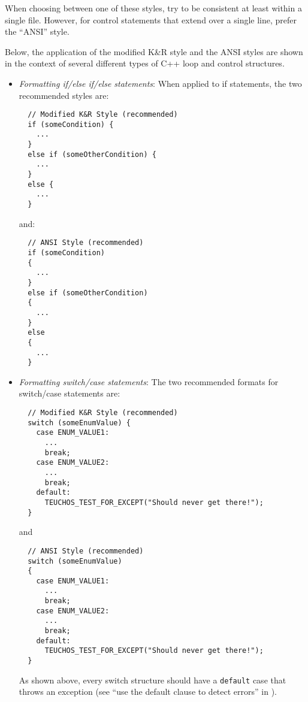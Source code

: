 \begin{itemize}
When choosing between one of these styles, try to be consistent at least
within a single file.  However, for control statements that extend over a
single line, prefer the ``ANSI'' style.

Below, the application of the modified K\&R style and the ANSI styles are
shown in the context of several different types of C++ loop and control
structures.

  \begin{itemize}

  {}\item\textit{Formatting if/else if/else
  statements}: When applied to if statements, the two recommended styles are:

  {\small\begin{verbatim}
  // Modified K&R Style (recommended)
  if (someCondition) {
    ...
  }
  else if (someOtherCondition) {
    ...
  }
  else {
    ...
  }
  \end{verbatim}}
  
  {}\noindent{}and:
  
  {\small\begin{verbatim}
  // ANSI Style (recommended)
  if (someCondition)
  {
    ...
  }
  else if (someOtherCondition)
  {
    ...
  }
  else
  {
    ...
  }
  \end{verbatim}}

  {}\item\textit{Formatting switch/case statements}:
  The two recommended formats for switch/case statements are:

  {\small\begin{verbatim}
  // Modified K&R Style (recommended)
  switch (someEnumValue) {
    case ENUM_VALUE1:
      ...
      break;
    case ENUM_VALUE2:
      ...
      break;
    default:
      TEUCHOS_TEST_FOR_EXCEPT("Should never get there!");
  }
  \end{verbatim}}

  {}\noindent{}and

  {\small\begin{verbatim}
  // ANSI Style (recommended)
  switch (someEnumValue)
  {
    case ENUM_VALUE1:
      ...
      break;
    case ENUM_VALUE2:
      ...
      break;
    default:
      TEUCHOS_TEST_FOR_EXCEPT("Should never get there!");
  }
  \end{verbatim}}

  As shown above, every switch structure should have a {}\texttt{default} case
  that throws an exception (see ``use the default clause to detect errors''
  in {}\cite[Section 15.1]{CodeComplete2nd04}).


\end{itemize}
\end{itemize}
